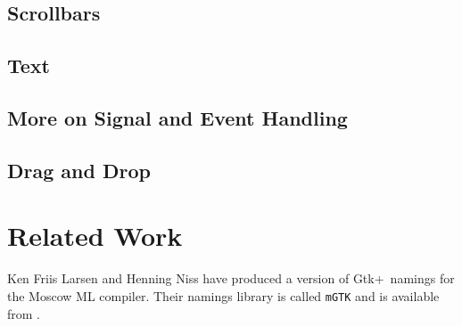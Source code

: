 \documentclass{article}
\newcommand{\gtk}{\mbox{\sf Gtk+}}
\begin{document}
\subsection{Scrollbars}

\subsection{Text}

\subsection{More on Signal and Event Handling}

\subsection{Drag and Drop}


\section{Related Work}

    Ken Friis Larsen and Henning Niss have produced a version of 
\gtk\ namings for the Moscow ML compiler.  Their namings library
is called \verb|mGTK|\cite{mGTK} and is available from
.


\end{document}
